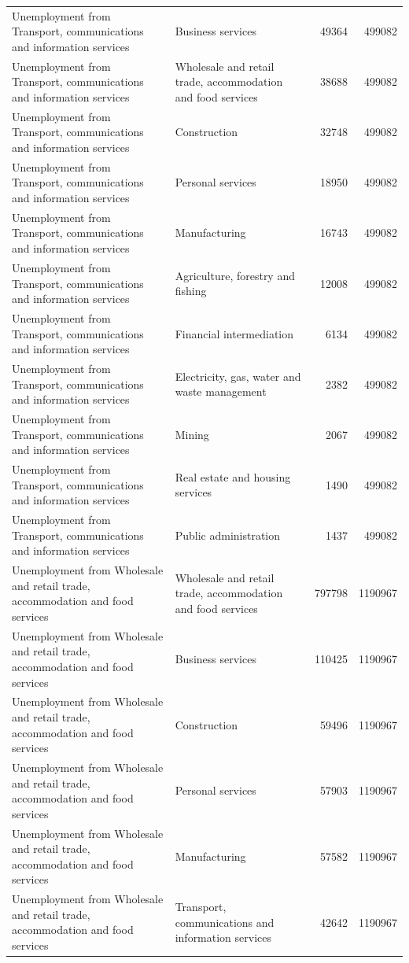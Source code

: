 \begin{longtable}{llrr}
Unemployment from Transport, communications and information services & Business services & 49364 & 499082 \\
Unemployment from Transport, communications and information services & Wholesale and retail trade, accommodation and food services & 38688 & 499082 \\
Unemployment from Transport, communications and information services & Construction & 32748 & 499082 \\
Unemployment from Transport, communications and information services & Personal services & 18950 & 499082 \\
Unemployment from Transport, communications and information services & Manufacturing & 16743 & 499082 \\
Unemployment from Transport, communications and information services & Agriculture, forestry and fishing & 12008 & 499082 \\
Unemployment from Transport, communications and information services & Financial intermediation & 6134 & 499082 \\
Unemployment from Transport, communications and information services & Electricity, gas, water and waste management & 2382 & 499082 \\
Unemployment from Transport, communications and information services & Mining & 2067 & 499082 \\
Unemployment from Transport, communications and information services & Real estate and housing services & 1490 & 499082 \\
Unemployment from Transport, communications and information services & Public administration & 1437 & 499082 \\
Unemployment from Wholesale and retail trade, accommodation and food services & Wholesale and retail trade, accommodation and food services & 797798 & 1190967 \\
Unemployment from Wholesale and retail trade, accommodation and food services & Business services & 110425 & 1190967 \\
Unemployment from Wholesale and retail trade, accommodation and food services & Construction & 59496 & 1190967 \\
Unemployment from Wholesale and retail trade, accommodation and food services & Personal services & 57903 & 1190967 \\
Unemployment from Wholesale and retail trade, accommodation and food services & Manufacturing & 57582 & 1190967 \\
Unemployment from Wholesale and retail trade, accommodation and food services & Transport, communications and information services & 42642 & 1190967 \\

\end{longtable}
